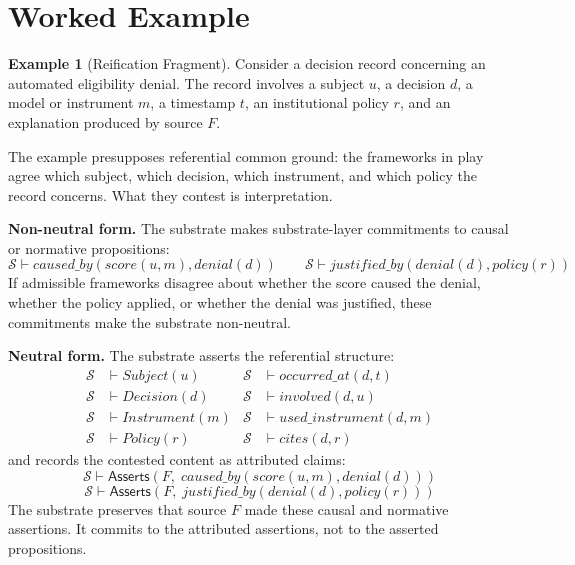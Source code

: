 \documentclass[11pt]{article}
\theoremstyle{plain}
\theoremstyle{definition}
\newtheorem{example}[theorem]{Example}
\theoremstyle{remark}
\newcommand{\Substrate}{\mathcal{S}}
\newcommand{\Framework}{F}
\newcommand{\entails}{\vdash}
\newcommand{\Asserts}{\mathsf{Asserts}}
\newcommand{\pred}[1]{\mathit{#1}}
\begin{document}
\section{Worked Example}
\label{sec:example}

\begin{example}[Reification Fragment]
  \label{se100.example.ReificationFragment}
  Consider a decision record concerning an automated eligibility denial. The
  record involves a subject $u$, a decision $d$, a model or instrument $m$, a
  timestamp $t$, an institutional policy $r$, and an explanation produced by
  source $\Framework$.
\end{example}

The example presupposes referential common ground:
the frameworks in play agree
which subject, which decision, which instrument, and which policy the record
concerns.
What they contest is interpretation.

\textbf{Non-neutral form.} The substrate makes substrate-layer commitments
to causal or normative propositions:
\[
  \Substrate \entails \pred{caused\_by}(\pred{score}(u,m), \pred{denial}(d))
  \qquad
  \Substrate \entails \pred{justified\_by}(\pred{denial}(d), \pred{policy}(r))
\]
If admissible frameworks disagree about whether the score caused the denial,
whether the policy applied, or whether the denial was justified,
these commitments make the substrate non-neutral.

\textbf{Neutral form.} The substrate asserts the referential structure:
\begin{align*}
  \Substrate & \entails \pred{Subject}(u)
             & \Substrate                    & \entails \pred{occurred\_at}(d,t)     \\
  \Substrate & \entails \pred{Decision}(d)
             & \Substrate                    & \entails \pred{involved}(d,u)         \\
  \Substrate & \entails \pred{Instrument}(m)
             & \Substrate                    & \entails \pred{used\_instrument}(d,m) \\
  \Substrate & \entails \pred{Policy}(r)
             & \Substrate                    & \entails \pred{cites}(d,r)
\end{align*}
and records the contested content as attributed claims:
\[
  \Substrate \entails \Asserts(\Framework,\;
  \pred{caused\_by}(\pred{score}(u,m), \pred{denial}(d)))
\]
\[
  \Substrate \entails \Asserts(\Framework,\;
  \pred{justified\_by}(\pred{denial}(d), \pred{policy}(r)))
\]
The substrate preserves that source $\Framework$
made these causal and normative assertions.
It commits to the attributed assertions, not to the asserted propositions.
\end{document}
